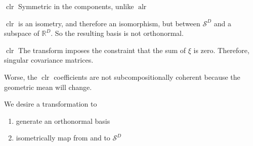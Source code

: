 \documentclass[dark]{cgem-presentation}
\DeclareMathOperator{\alr}{\operatorname{alr}}
\DeclareMathOperator{\clr}{\operatorname{clr}}
\begin{document}
\begin{frame}{$\clr$}
	\LARGE
	Symmetric in the components, unlike $\alr$

	\vspace{4mm}
	$\clr$ is an isometry, and therefore an isomorphism, but
	between $\mathcal{S}^D$ and a \textcolor{ThirdColor}{
		subspace} of $\mathbb{R}^D$. So the resulting basis
	is not orthonormal.
\end{frame}

\begin{frame}{$\clr$}
	\LARGE
	The transform imposes the constraint that the sum of
	$\xi$ is zero. Therefore, singular covariance matrices.

	\vspace{4mm}
	Worse, the $\clr$ coefficients are not subcompositionally
	coherent because the geometric mean will change.
\end{frame}

\begin{frame}
	\LARGE
	We desire a transformation to 
	\begin{enumerate}
		\item generate an orthonormal basis
		\item isometrically map from and to $\mathcal{S}^D$
	\end{enumerate}
\end{frame}
\end{document}
